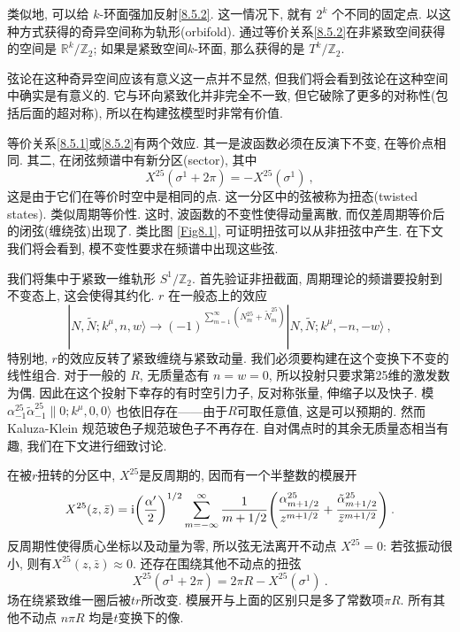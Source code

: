类似地, 可以给 $k$-环面强加反射\eqref{8.5.2}. 这一情况下, 就有 $2^{k}$ 个不同的固定点. 以这种方式获得的奇异空间称为轨形(orbifold). 
通过等价关系\eqref{8.5.2}在非紧致空间获得的空间是 $\mathds{R}^{k} / \mathds{Z}_{2}$; 
如果是紧致空间$k$-环面, 那么获得的是 $T^{k} / \mathds{Z}_{2}$.

弦论在这种奇异空间应该有意义这一点并不显然, 但我们将会看到弦论在这种空间中确实是有意义的. 
它与环向紧致化并非完全不一致, 但它破除了更多的对称性(包括后面的超对称), 所以在构建弦模型时非常有价值.

等价关系\eqref{8.5.1}或\eqref{8.5.2}有两个效应. 其一是波函数必须在反演下不变, 在等价点相同. 其二, 在闭弦频谱中有新分区(sector), 其中 
\begin{equation}
	X^{25}(\sigma^{1}+2 \pi)=-X^{25}(\sigma^{1}) \:, \label{8.5.4}
\end{equation}
这是由于它们在等价时空中是相同的点. 这一分区中的弦被称为扭态(twisted states). 类似周期等价性. 
这时, 波函数的不变性使得动量离散, 而仅差周期等价后的闭弦(缠绕弦)出现了. 类比图 \ref{Fig8.1}, 可证明扭弦可以从非扭弦中产生. 
在下文我们将会看到, 模不变性要求在频谱中出现这些弦.

我们将集中于紧致一维轨形 $S^{1} / \mathds{Z}_{2}$. 首先验证非扭截面, 周期理论的频谱要投射到不变态上, 这会使得其约化. $r$ 在一般态上的效应
\begin{equation}
	|N, \tilde{N} ; k^{\mu}, n, w \rangle \rightarrow 
	(-1)^{\sum_{m=1}^{\infty}(N_{m}^{25}+\tilde{N}_{m}^{25})}|N, \tilde{N} ; k^{\mu},-n,-w\rangle \:, \label{8.5.5}
\end{equation}
特别地, $r$的效应反转了紧致缠绕与紧致动量. 我们必须要构建在这个变换下不变的线性组合. 对于一般的 $R$, 无质量态有 $n=w=0$, 所以投射只要求第25维的激发数为偶. 
因此在这个投射下幸存的有时空引力子, 反对称张量, 伸缩子以及快子. 模 $\alpha_{-1}^{25} \tilde{\alpha}_{-1}^{25}\|0 ; k^{\mu}, 0,0\rangle$ 也依旧存在——由于$R$可取任意值, 这是可以预期的. 然而 Kaluza-Klein 规范玻色子规范玻色子不再存在. 自对偶点时的其余无质量态相当有趣, 我们在下文进行细致讨论.

在被$r$扭转的分区中,  $X^{25}$是反周期的, 因而有一个半整数的模展开
\begin{equation}
	X^{25}(z, \bar{z})= \mathrm{i}\biggl(\frac{\alpha^{\prime}}{2}\biggr)^{1/2} 
	\sum_{m=-\infty}^{\infty} \frac{1}{m+1/2}\Biggl(\frac{\alpha_{m + 1/2}^{25}}{z^{m + 1/2}} 
	+ \frac{\tilde{\alpha}_{m+ 1/2}^{25}}{\bar{z}^{m + 1/2}}\Biggr) \:. \label{8.5.6}
\end{equation}
反周期性使得质心坐标以及动量为零, 所以弦无法离开不动点 $X^{25}=0$: 若弦振动很小, 则有$X^{25}(z, \bar{z}) \approx 0 $. 还存在围绕其他不动点的扭弦
\begin{equation}
	X^{25}(\sigma^{1}+2 \pi)=2 \pi R-X^{25}(\sigma^{1}) \:. \label{8.5.7}
\end{equation}
场在绕紧致维一圈后被$t r$所改变. 模展开与上面的区别只是多了常数项$\pi R$. 所有其他不动点 $n \pi R$ 均是$t$变换下的像.

